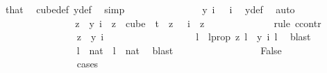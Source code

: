 \begin{isabellebody}
\ that\ \isamarkupfalse%
\ cube{\isacharunderscore}{\kern0pt}def\ y{\isacharunderscore}{\kern0pt}def\ \isamarkupfalse%
\ simp\isanewline
\ \ \ \ \ \ \ \ \ \ \ \ \isamarkupfalse%
\ \isamarkupfalse%
\ {\isachardoublequoteopen}y\ i\ {}\ {\isacharequal}{\kern0pt}\ i{\isachardoublequoteclose}\ \isamarkupfalse%
\ y{\isacharunderscore}{\kern0pt}def\ \isamarkupfalse%
\ auto\isanewline
\ \ \ \ \ \ \ \ \ \ \ \ \isamarkupfalse%
\ \isamarkupfalse%
\ {\isachardoublequoteopen}z\ {\isacharequal}{\kern0pt}\ y\ i{\isachardoublequoteclose}\ \ {\isachardoublequoteopen}z\ {\isasymin}\ cube\ {}\ t{\isachardoublequoteclose}\ \ {\isachardoublequoteopen}z\ {}\ {\isacharequal}{\kern0pt}\ i{\isachardoublequoteclose}\ \ z\isanewline
\ \ \ \ \ \ \ \ \ \ \ \ \isamarkupfalse%
\ {\isacharparenleft}{\kern0pt}rule\ ccontr{\isacharparenright}{\kern0pt}\isanewline
\ \ \ \ \ \ \ \ \ \ \ \ \ \ \isamarkupfalse%
\ {\isachardoublequoteopen}z\ {\isasymnoteq}\ y\ i{\isachardoublequoteclose}\ \isanewline
\ \ \ \ \ \ \ \ \ \ \ \ \ \ \isamarkupfalse%
\ \isamarkupfalse%
\ l\ \ l{\isacharunderscore}{\kern0pt}prop{\isacharcolon}{\kern0pt}\ {\isachardoublequoteopen}z\ l\ {\isasymnoteq}\ y\ i\ l{\isachardoublequoteclose}\ \isamarkupfalse%
\ blast\isanewline
\ \ \ \ \ \ \ \ \ \ \ \ \ \ \isamarkupfalse%
\ {\isachardoublequoteopen}l\ {\isasymin}\ {\isacharbraceleft}{\kern0pt}{\isachardot}{\kern0pt}{\isachardot}{\kern0pt}{\isacharless}{\kern0pt}{}{\isacharcolon}{\kern0pt}{\isacharcolon}{\kern0pt}nat{\isacharbraceright}{\kern0pt}{\isachardoublequoteclose}\ {\isacharbar}{\kern0pt}\ {\isachardoublequoteopen}l\ {\isasymnotin}\ {\isacharbraceleft}{\kern0pt}{\isachardot}{\kern0pt}{\isachardot}{\kern0pt}{\isacharless}{\kern0pt}{}{\isacharcolon}{\kern0pt}{\isacharcolon}{\kern0pt}nat{\isacharbraceright}{\kern0pt}{\isachardoublequoteclose}\ \isamarkupfalse%
\ blast\isanewline
\ \ \ \ \ \ \ \ \ \ \ \ \ \ \isamarkupfalse%
\ \isamarkupfalse%
\ False\isanewline
\ \ \ \ \ \ \ \ \ \ \ \ \ \ \isamarkupfalse%
\ cases\isanewline
\ \ \ \ \ \ \ \ \ \ \ \ \ \ \ \ \isamarkupfalse%
\ {}\isanewline
\ \ \ \ \ \ \ \ \ \ \ \ \ \ \ \ \isamarkupfalse%

\end{isabellebody}
